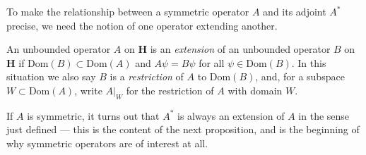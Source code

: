 To make the relationship between a symmetric operator $A$ and its adjoint $A^*$ precise, we need the notion of one operator extending another.

\begin{definition}
    \label{def:hall-9.3}
    \leanok
    An unbounded operator $A$ on $\mathbf{H}$ is an \textit{extension} of an unbounded operator $B$ on $\mathbf{H}$ if $\text{Dom}(B) \subset \text{Dom}(A)$ and $A\psi = B\psi$ for all $\psi \in \text{Dom}(B)$. In this situation we also say $B$ is a \textit{restriction} of $A$ to $\text{Dom}(B)$, and, for a subspace $W \subset \text{Dom}(A)$, write $A\vert_W$ for the restriction of $A$ with domain $W$.
\end{definition}

If $A$ is symmetric, it turns out that $A^*$ is always an extension of $A$ in the sense just defined — this is the content of the next proposition, and is the beginning of why symmetric operators are of interest at all.

